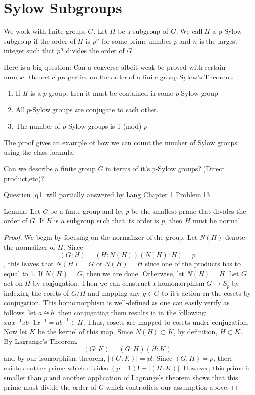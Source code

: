\documentclass[main.tex]{subfiles}
\begin{document}
\section{Sylow Subgroups}

We work with finite groups $G$. Let $H$ be a subgroup of $G$. We call $H$ a p-Sylow subgroup if the order of $H$ is $p^n$ for some prime number $p$ and $n$ is the largest integer such that $p^n$ divides the order of $G$. 
\par Here is a big question: Can a converse albeit weak be proved with certain number-theoretic properties on the order of a finite group
Sylow's Theorems

\begin{enumerate}
\item If $H$ is a $p$-group, then it must be contained in some $p$-Sylow group
\item All $p$-Sylow groups are conjugate to each other.
\item The number of $p$-Sylow groups is 1 (mod) $p$
\end{enumerate}

The proof gives an example of how we can count the number of Sylow groups using the class formula.

\begin{question}
\label{q1}
Can we describe a finite group $G$ in terms of it's p-Sylow groups? (Direct product,etc)?
\end{question}

Question \ref{q1} will partially answered by Lang Chapter 1 Problem 13 


\par Lemma: Let $G$ be a finite group and let $p$ be the smallest prime that divides the order of $G$. If $H$ is a subgroup such that its order is $p$, then $H$ must be normal.

\begin{proof}
 We begin by focusing on the normalizer of the group. Let $N(H)$ denote the normalizer of $H$. Since $$ (G:H) = (H:N(H))(N(H): H) = p$$, this leaves that $N(H) = G$ or $N(H) = H$ since one of the products has to equal to 1. If $N(H) = G$, then we are done. Otherwise, let $N(H) = H$. Let $G$ act on $H$ by conjugation. Then we can construct a homomorphism $G \rightarrow S_p$ by indexing the cosets of $G/H$ and mapping any $g \in G$ to it's action on the cosets by conjugation. This homomorphism is well-defined as one can easily verify as follows:
let $a \cong b$, then conjugating them results in in the following: $xax^{-1}xb^-1x^{-1} = ab^{-1} \in H$. Thus, cosets are mapped to cosets under conjugation. Now let $K$ be the kernel of this map. Since $N(H) \subset K$, by definition, $H \subset K$. By Lagrange's Theorem, $$ (G: K) = (G: H)(H:K) $$ and by our isomorphism theorem, $|(G:K)| = p!$. Since $(G:H) = p$, there exists another prime which divides $(p-1)! = |(H:K)|$. However, this prime is smaller than $p$ and another application of Lagrange's theorem shows that this prime must divide the order of $G$ which contradicts our assumption above.
\end{proof}
\end{document}
